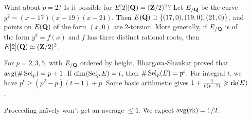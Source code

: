 What about $p=2$? Is it possible for $E[2](\mathbf{Q})=(\mathbf{Z}/2)^2$? Let $E_{/\mathbf{Q}}$ be 
the curve $y^2=(x-17)(x-19)(x-21)$. Then 
$E(\mathbf{Q})\supset \{(17,0),(19,0),(21,0)\}$, and points on 
$E(\mathbf{Q})$ of the form $(x,0)$ are $2$-torsion. More generally, if 
$E_{/\mathbf{Q}}$ is of the form $y^2=f(x)$ and $f$ has three distinct rational roots, 
then $E[2](\mathbf{Q})\simeq (\mathbf{Z}/2)^2$. 

For $p=2,3,5$, with $E_{/\mathbf{Q}}$ ordered by height, Bhargava-Shankar proved that 
$\operatorname{avg}(\#\operatorname{Sel}_p) = p+1$. If 
$\dim(\operatorname{Sel}_pE)=t$, then $\# \operatorname{Sel}_p(E)=p^t$. For integral 
$t$, we have $p^t\geqslant (p^2-p)(t-1)+p$. Some basic arithmetic gives 
$1+\frac{1}{p(p-1)} \geqslant \operatorname{rk}(E)$. 

Proceeding na\"ively won't get an average $\leqslant 1$. 
We expect $\operatorname{avg}(\operatorname{rk} )=1/2$. 




